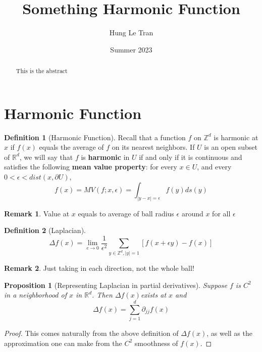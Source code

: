 \documentclass[openany, amssymb, psamsfonts]{amsart}
\title{Something Harmonic Function}
\author{Hung Le Tran}
\date{Summer 2023}
\newtheorem{prop}{Proposition}[section]
\theoremstyle{definition}
\newtheorem{defn}{Definition}[section]
\newtheorem{rem}{Remark}[section]
\numberwithin{equation}{section}
\newcommand{\bbr}{\mathbb{R}}
\newcommand{\bbz}{\mathbb{Z}}
\renewcommand{\_}[1]{\underline{#1}}
\begin{document}
\begin{abstract}

    This is the abstract

\end{abstract}

\maketitle

\tableofcontents

\section{Harmonic Function}

\begin{defn} [Harmonic Function]
    Recall that a function \(f\) on \(\bbz^d\) is harmonic at \(x\) if \(f(x)\) equals the average of \(f\) on its nearest neighbors. If \(U\) is an open subset of \(\bbr^d\), we will say that \(f\) is \textbf{harmonic} in \(U\) if and only if it is continuous and satisfies the following \textbf{mean value property}: for every \(x \in U\), and every \(0 < \epsilon < dist(x, \partial U)\),
    \begin{equation}
        f(x) = MV(f; x, \epsilon) = \int_{|y-x| = \epsilon}f(y) ds(y)
    \end{equation}
\end{defn}

\begin{rem}
    Value at \(x\) equals to average of ball radius \(\epsilon\) around \(x\) for all \(\epsilon\)
\end{rem}

\begin{defn} [Laplacian]
    \[
        \Delta f(x) = \lim_{e \to 0} \dfrac{1}{\epsilon^2}\sum_{y \in \bbz^d, |y| = 1} [f(x + \epsilon y) - f(x)]
    \]
\end{defn}
\begin{rem}
    Just taking in each direction, not the whole ball!
\end{rem}
\begin{prop} [Representing Laplacian in partial derivatives]
    Suppose \(f\) is \(C^2\) in a neighborhood of \(x\) in \(\bbr^d\). Then \(\Delta f(x) \)exists at \(x\) and \[
        \Delta f(x) = \sum_{j=1}^{d} \partial_{jj} f(x)
    \]
\end{prop}
\begin{proof}
    This comes naturally from the above definition of \(\Delta f(x)\), as well as the approximation one can make from the \(C^2\) smoothness of \(f(x)\).
\end{proof}
\end{document}
